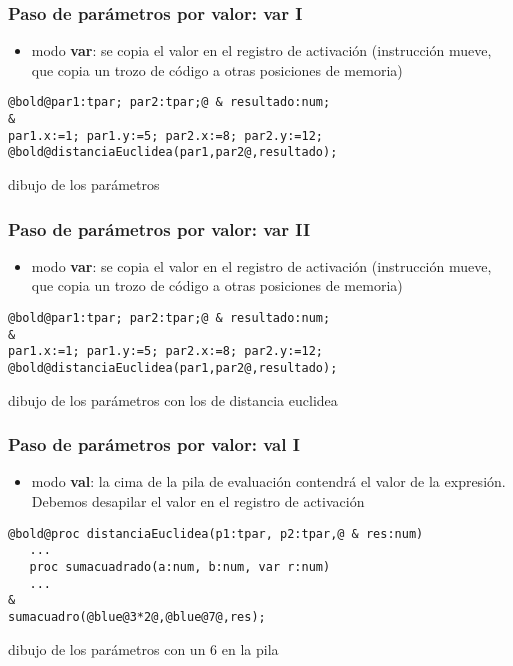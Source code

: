 \documentclass[hyperref={pdfpagelabels=false},tree-dvips,compress]{beamer}
\begin{document}
\begin{frame}[fragile]
\frametitle{Paso de parámetros por valor: var I}

\begin{itemize}
	\item modo \textbf{var}: se copia el valor en el
registro de activación (instrucción mueve, que copia un trozo de código a otras posiciones de memoria)
\end{itemize}

\begin{lstlisting}[style=codigo,basicstyle=\footnotesize\ttfamily]
@bold@par1:tpar; par2:tpar;@ & resultado:num;
&
par1.x:=1; par1.y:=5; par2.x:=8; par2.y:=12;
@bold@distanciaEuclidea(par1,par2@,resultado);
\end{lstlisting}

dibujo de los parámetros

\end{frame}
\begin{frame}[fragile]
\frametitle{Paso de parámetros por valor: var II}

\begin{itemize}
	\item modo \textbf{var}: se copia el valor en el
registro de activación (instrucción mueve, que copia un trozo de código a otras posiciones de memoria)
\end{itemize}

\begin{lstlisting}[style=codigo,basicstyle=\footnotesize\ttfamily]
@bold@par1:tpar; par2:tpar;@ & resultado:num;
&
par1.x:=1; par1.y:=5; par2.x:=8; par2.y:=12;
@bold@distanciaEuclidea(par1,par2@,resultado);
\end{lstlisting}

dibujo de los parámetros con los de distancia euclidea

\end{frame}
\begin{frame}[fragile]
\frametitle{Paso de parámetros por valor: val I}

\begin{itemize}
	\item modo \textbf{val}: la cima de la pila de
evaluación contendrá el valor de la expresión. Debemos desapilar el valor en el registro de activación
\end{itemize}

\begin{lstlisting}[style=codigo,basicstyle=\footnotesize\ttfamily]
@bold@proc distanciaEuclidea(p1:tpar, p2:tpar,@ & res:num)
   ...
   proc sumacuadrado(a:num, b:num, var r:num)
   ...
&
sumacuadro(@blue@3*2@,@blue@7@,res);
\end{lstlisting}

dibujo de los parámetros con un 6 en la pila

\end{frame}
\end{document}
